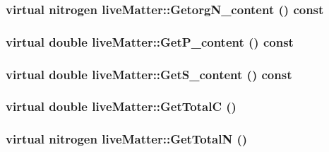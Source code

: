 \hypertarget{classlive_matter_ac4b95fdff5ad224d9aa1541589c64663}{
\subsubsection[{GetorgN\_\-content}]{\setlength{\rightskip}{0pt plus 5cm}virtual {\bf nitrogen} liveMatter::GetorgN\_\-content () const}}
\label{classlive_matter_ac4b95fdff5ad224d9aa1541589c64663}
\hypertarget{classlive_matter_aed9acd0807e62d97e092ea6c2aaa966f}{
\subsubsection[{GetP\_\-content}]{\setlength{\rightskip}{0pt plus 5cm}virtual double liveMatter::GetP\_\-content () const}}
\label{classlive_matter_aed9acd0807e62d97e092ea6c2aaa966f}
\hypertarget{classlive_matter_a1006a296abc6361ae90010ff27ff8281}{
\subsubsection[{GetS\_\-content}]{\setlength{\rightskip}{0pt plus 5cm}virtual double liveMatter::GetS\_\-content () const}}
\label{classlive_matter_a1006a296abc6361ae90010ff27ff8281}
\hypertarget{classlive_matter_a62259dba6b54a8d4d8684cbe9bf312ce}{
\subsubsection[{GetTotalC}]{\setlength{\rightskip}{0pt plus 5cm}virtual double liveMatter::GetTotalC ()}}
\label{classlive_matter_a62259dba6b54a8d4d8684cbe9bf312ce}
\hypertarget{classlive_matter_a1688ff189b2809aeefd3b25b74f8446d}{
\subsubsection[{GetTotalN}]{\setlength{\rightskip}{0pt plus 5cm}virtual {\bf nitrogen} liveMatter::GetTotalN ()}}
